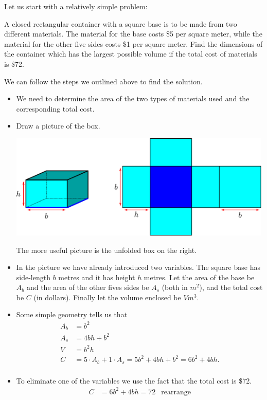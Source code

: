 Let us start with a relatively simple problem:
\begin{eg}\label{APPglobalMaxMinB}
A closed rectangular container with a square base is to be made
from two different materials. The material for the base costs \$5 per square
meter, while the material for the other five sides costs \$1 per square
meter. Find the dimensions of the container which has the largest possible
volume if the total cost of materials is \$72.

\soln We can follow the steps we outlined above to find the solution.
\begin{itemize}
 \item We need to determine the area of the two types of materials used and the
corresponding total cost.
 \item Draw a picture of the box.
\begin{efig}
\centering
 \includegraphics[height=5cm]{extra/container}
\end{efig}
The more useful picture is the unfolded box on the right.
\item In the picture we have already introduced two variables. The square base has
side-length $b$ metres and it has height $h$ metres. Let the area of the base be $A_b$
and the area of the other fives sides be $A_s$ (both in $m^2$), and the total cost be
$C$ (in dollars). Finally let the volume enclosed be $V m^3$.
\item Some simple geometry tells us that
\begin{align*}
  A_b &= b^2 \\
  A_s &= 4 bh + b^2 \\
  V &= b^2h\\
  C &= 5 \cdot A_b + 1\cdot A_s = 5b^2+4bh+b^2 = 6b^2+4bh.\\
\end{align*}
\item To eliminate one of the variables we use the fact that the total cost is \$72.
\begin{align*}
  C &= 6b^2+4bh = 72 & \text{rearrange}\\

\end{align*}
\end{itemize}
\end{eg}
